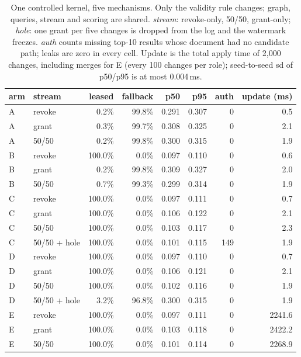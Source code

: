 \begin{table}[t]\centering\footnotesize
\caption{One controlled kernel, five mechanisms. Only the validity rule changes; graph, queries, stream and scoring are shared. \emph{stream}: revoke-only, 50/50, grant-only; \emph{hole}: one grant per five changes is dropped from the log and the watermark freezes. \emph{auth} counts missing top-10 results whose document had no candidate path; leaks are zero in every cell. Update is the total apply time of 2{,}000 changes, including merges for E (every 100 changes per role); seed-to-seed sd of p50/p95 is at most 0.004\,ms.}
\label{tab:ae}
\begin{tabular}{@{}llrrrrrr@{}}\toprule
arm & stream & leased & fallback & p50 & p95 & auth & update (ms) \\
\midrule
A & revoke & 0.2\% & 99.8\% & 0.291 & 0.307 & 0 & 0.5 \\
A & grant & 0.3\% & 99.7\% & 0.308 & 0.325 & 0 & 2.1 \\
A & 50/50 & 0.2\% & 99.8\% & 0.300 & 0.315 & 0 & 1.9 \\
B & revoke & 100.0\% & 0.0\% & 0.097 & 0.110 & 0 & 0.6 \\
B & grant & 0.2\% & 99.8\% & 0.309 & 0.327 & 0 & 2.0 \\
B & 50/50 & 0.7\% & 99.3\% & 0.299 & 0.314 & 0 & 1.9 \\
C & revoke & 100.0\% & 0.0\% & 0.097 & 0.111 & 0 & 0.7 \\
C & grant & 100.0\% & 0.0\% & 0.106 & 0.122 & 0 & 2.1 \\
C & 50/50 & 100.0\% & 0.0\% & 0.103 & 0.117 & 0 & 2.3 \\
C & 50/50 + hole & 100.0\% & 0.0\% & 0.101 & 0.115 & 149 & 1.9 \\
D & revoke & 100.0\% & 0.0\% & 0.097 & 0.110 & 0 & 0.7 \\
D & grant & 100.0\% & 0.0\% & 0.106 & 0.121 & 0 & 2.1 \\
D & 50/50 & 100.0\% & 0.0\% & 0.102 & 0.116 & 0 & 1.9 \\
D & 50/50 + hole & 3.2\% & 96.8\% & 0.300 & 0.315 & 0 & 1.9 \\
E & revoke & 100.0\% & 0.0\% & 0.097 & 0.111 & 0 & 2241.6 \\
E & grant & 100.0\% & 0.0\% & 0.103 & 0.118 & 0 & 2422.2 \\
E & 50/50 & 100.0\% & 0.0\% & 0.101 & 0.114 & 0 & 2268.9 \\
\bottomrule\end{tabular}\end{table}

